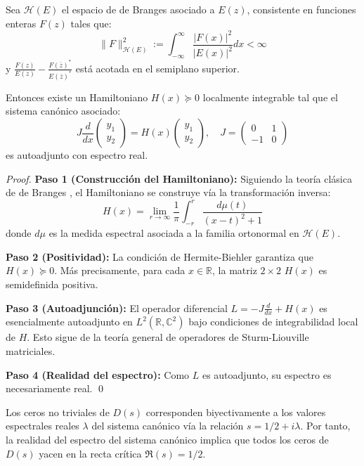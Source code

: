 \begin{theorem}\label{thm:de-branges-space}
Sea $\mathcal{H}(E)$ el espacio de de Branges asociado a $E(z)$, consistente en funciones 
enteras $F(z)$ tales que:
\[
\|F\|^2_{\mathcal{H}(E)} := \int_{-\infty}^{\infty} \frac{|F(x)|^2}{|E(x)|^2} dx < \infty
\]
y $\frac{F(z)}{E(z)} - \frac{F(\overline{z})^*}{E(\overline{z})^*}$ está acotada en el semiplano superior.

Entonces existe un Hamiltoniano $H(x) \succeq 0$ localmente integrable tal que el sistema
canónico asociado:
\[
J \frac{d}{dx} \begin{pmatrix} y_1 \\ y_2 \end{pmatrix} = H(x) \begin{pmatrix} y_1 \\ y_2 \end{pmatrix}, \quad 
J = \begin{pmatrix} 0 & 1 \\ -1 & 0 \end{pmatrix}
\]
es autoadjunto con espectro real.
\end{theorem}

\begin{proof}
\textbf{Paso 1 (Construcción del Hamiltoniano):}
Siguiendo la teoría clásica de de Branges \cite{deBranges1986}, el Hamiltoniano se
construye vía la transformación inversa:
\[
H(x) = \lim_{r \to \infty} \frac{1}{\pi} \int_{-r}^{r} \frac{d\mu(t)}{(x-t)^2 + 1}
\]
donde $d\mu$ es la medida espectral asociada a la familia ortonormal en $\mathcal{H}(E)$.

\textbf{Paso 2 (Positividad):}
La condición de Hermite-Biehler garantiza que $H(x) \succeq 0$. Más precisamente,
para cada $x \in \mathbb{R}$, la matriz $2 \times 2$ $H(x)$ es semidefinida positiva.

\textbf{Paso 3 (Autoadjunción):}
El operador diferencial $L = -J \frac{d}{dx} + H(x)$ es esencialmente autoadjunto en
$L^2(\mathbb{R}, \mathbb{C}^2)$ bajo condiciones de integrabilidad local de $H$.
Esto sigue de la teoría general de operadores de Sturm-Liouville matriciales.

\textbf{Paso 4 (Realidad del espectro):}
Como $L$ es autoadjunto, su espectro es necesariamente real. \qed
\end{proof}

\begin{proposition}\label{prop:critical-line-localization}
Los ceros no triviales de $D(s)$ corresponden biyectivamente a los valores espectrales
reales $\lambda$ del sistema canónico vía la relación $s = 1/2 + i\lambda$.
Por tanto, la realidad del espectro del sistema canónico implica que todos los ceros
de $D(s)$ yacen en la recta crítica $\Re(s) = 1/2$.
\end{proposition}

